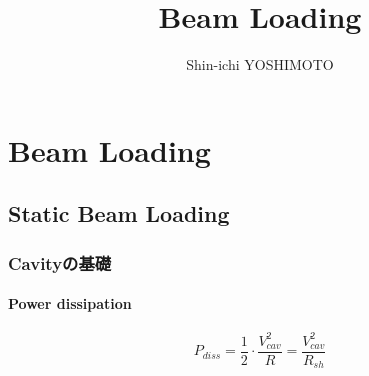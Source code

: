 \documentclass[book]{jlreq}
\begin{document}
\title{Beam Loading}
\author{Shin-ichi YOSHIMOTO}
\maketitle
\tableofcontents



\part{Beam Loading}
\chapter{Static Beam Loading}
\section{Cavityの基礎}
\subsection{Power dissipation}
\begin{equation}
    P_{diss} = \frac{1}{2} \cdot \frac{V_{cav}^2}{R} = \frac{V_{cav}^2}{R_{sh}} 
\end{equation}
\end{document}
